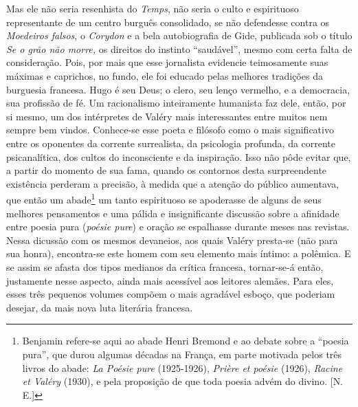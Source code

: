Mas ele não seria resenhista do \emph{Temps}, não seria o culto e
espirituoso representante de um centro burguês consolidado, se não
defendesse contra os \emph{Moedeiros falsos}, o \emph{Corydon} e a bela
autobiografia de Gide, publicada sob o título \emph{Se o grão não
morre,} os direitos do instinto ``saudável'', mesmo com certa falta de
consideração. Pois, por mais que esse jornalista evidencie teimosamente
suas máximas e caprichos, no fundo, ele foi educado pelas melhores
tradições da burguesia francesa. Hugo é seu Deus; o clero, seu lenço
vermelho, e a democracia, sua profissão de fé. Um racionalismo
inteiramente humanista faz dele, então, por si mesmo, um dos intérpretes
de Valéry mais interessantes entre muitos nem sempre bem vindos.
Conhece-se esse poeta e filósofo como o mais significativo entre os
oponentes da corrente surrealista, da psicologia profunda, da corrente
psicanalítica, dos cultos do inconsciente e da inspiração. Isso não pôde
evitar que, a partir do momento de sua fama, quando os contornos desta
surpreendente existência perderam a precisão, à medida que a atenção do
público aumentava, que então um abade\footnote{Benjamin refere-se aqui
  ao abade Henri Bremond e ao debate sobre a ``poesia pura'', que durou
  algumas décadas na França, em parte motivada pelos três livros do
  abade: \emph{La Poésie pure} (1925-1926), \emph{Prière et poésie}
  (1926), \emph{Racine et Valéry} (1930), e pela proposição de que toda
  poesia advém do divino. {[}N. E.{]}} um tanto espirituoso se
apoderasse de alguns de seus melhores pensamentos e uma pálida e
insignificante discussão sobre a afinidade entre poesia pura
(\emph{poésie pure}) e oração se espalhasse durante meses nas revistas.
Nessa dicussão com os mesmos devaneios, aos quais Valéry presta-se (não
para sua honra), encontra-se este homem com seu elemento mais íntimo: a
polêmica. E se assim se afasta dos tipos medianos da crítica francesa,
tornar-se-á então, justamente nesse aspecto, ainda mais acessível aos
leitores alemães. Para eles, esses três pequenos volumes compõem o mais
agradável esboço, que poderiam desejar, da mais nova luta literária
francesa.

